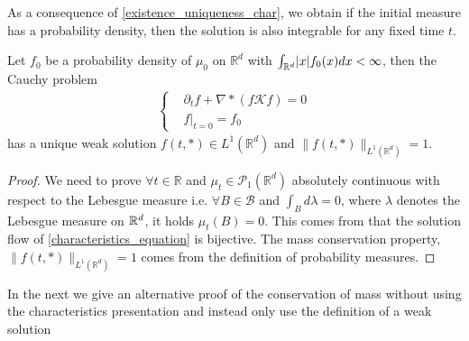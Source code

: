 As a consequence of \autoref{existence_uniqueness_char}, we obtain if the initial measure has a probability density, then the solution is also integrable 
for any fixed time $t$. 
\begin{corollary}
 Let $f_{0}$ be a probability density of $\mu_0$ on $\mathbb{R}^{d}$ with 
$  \int_{\mathbb{R}^{d} } \lvert x\rvert f_0(x) dx < \infty$,
then the Cauchy problem 
 \begin{align*}
  \begin{cases}
    &\partial_t f + \nabla * (f \mathcal{K} f)  = 0\\
    &f\rvert_{t=0} = f_{0}
  \end{cases}
 \end{align*}
 has a unique weak solution $f(t,*) \in  L^{1}(\mathbb{R}^{d} ) $ and $\|f(t,*)\|_{L^{1}(\mathbb{R}^{d} ) } = 1$.
\end{corollary}
\begin{proof}
 We need to prove $\forall  t \in  \mathbb{R}$ and $\mu_t \in  \mathcal{P}_1(\mathbb{R}^{d} )$ absolutely continuous with respect to the 
 Lebesgue measure i.e. $\forall  B \in  \mathcal{B}$ and $\int_{B} d\lambda  = 0$, where $\lambda$ denotes the Lebesgue measure on $\mathbb{R}^d$, it holds $\mu_t(B) = 0$. This comes from that the solution flow of \autoref{characteristics_equation} is bijective.
 The mass conservation property, $\|f(t,*)\|_{L^{1}(\mathbb{R}^{d} ) } = 1$  comes from the definition of probability measures.
\end{proof}
\vskip5mm
In the next we give an alternative proof of the conservation of mass without using the characteristics presentation and instead only use 
the definition of a weak solution\\[1ex]
